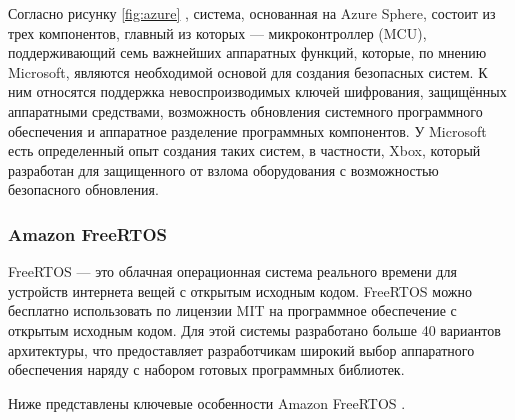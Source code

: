 Согласно рисунку \ref{fig:azure} \cite{Azure_Sphere_parts}, система, основанная на Azure Sphere, состоит из трех компонентов, главный из которых --- микроконтроллер (MCU), поддерживающий семь важнейших аппаратных функций, которые, по мнению Microsoft, являются необходимой основой для создания безопасных систем. К ним относятся поддержка невоспроизводимых ключей шифрования, защищённых аппаратными средствами, возможность обновления системного программного обеспечения и аппаратное разделение программных компонентов. У Microsoft есть определенный опыт создания таких систем, в частности, Xbox, который разработан для защищенного от взлома оборудования с возможностью безопасного обновления.



\subsubsection{Amazon FreeRTOS}

FreeRTOS \cite{Amazon_FreeRTOS_overview} --- это облачная операционная система реального времени для устройств интернета вещей с открытым исходным кодом. FreeRTOS можно бесплатно использовать по лицензии MIT на программное обеспечение с открытым исходным кодом. Для этой системы разработано больше 40 вариантов архитектуры, что предоставляет разработчикам широкий выбор аппаратного обеспечения наряду с набором готовых программных библиотек.

Ниже представлены ключевые особенности Amazon FreeRTOS \cite{Amazon_FreeRTOS_features}.

